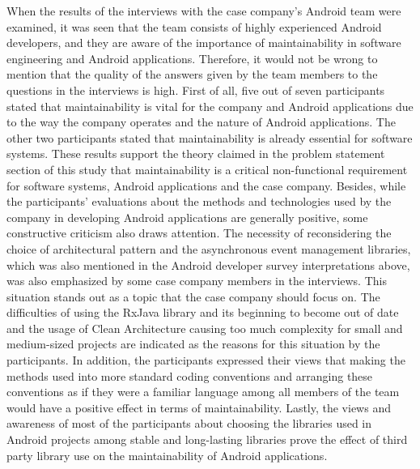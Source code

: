 When the results of the interviews with the case company's Android team were examined, it was seen that the team consists of highly experienced Android developers, and they are aware of the importance of maintainability in software engineering and Android applications. Therefore, it would not be wrong to mention that the quality of the answers given by the team members to the questions in the interviews is high. First of all, five out of seven participants stated that maintainability is vital for the company and Android applications due to the way the company operates and the nature of Android applications. The other two participants stated that maintainability is already essential for software systems. These results support the theory claimed in the problem statement section of this study that maintainability is a critical non-functional requirement for software systems, Android applications and the case company. Besides, while the participants' evaluations about the methods and technologies used by the company in developing Android applications are generally positive, some constructive criticism also draws attention. The necessity of reconsidering the choice of architectural pattern and the asynchronous event management libraries, which was also mentioned in the Android developer survey interpretations above, was also emphasized by some case company members in the interviews. This situation stands out as a topic that the case company should focus on. The difficulties of using the RxJava library and its beginning to become out of date and the usage of Clean Architecture causing too much complexity for small and medium-sized projects are indicated as the reasons for this situation by the participants. In addition, the participants expressed their views that making the methods used into more standard coding conventions and arranging these conventions as if they were a familiar language among all members of the team would have a positive effect in terms of maintainability. Lastly, the views and awareness of most of the participants about choosing the libraries used in Android projects among stable and long-lasting libraries prove the effect of third party library use on the maintainability of Android applications.

